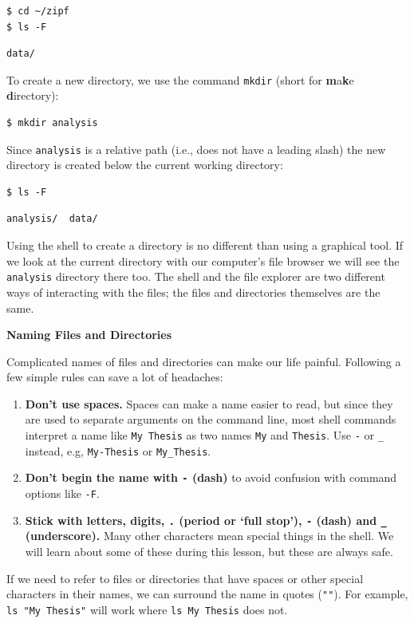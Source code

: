 \documentclass[
]{krantz}
\renewenvironment{quote}{\begin{VF}}{\end{VF}}
\begin{document}
\begin{verbatim}
$ cd ~/zipf
$ ls -F
\end{verbatim}

\begin{verbatim}
data/
\end{verbatim}

To create a new directory,
we use the command \texttt{mkdir} (short for \textbf{m}a\textbf{k}e \textbf{d}irectory):

\begin{verbatim}
$ mkdir analysis
\end{verbatim}

Since \texttt{analysis} is a relative path
(i.e., does not have a leading slash)
the new directory is created below the current working directory:

\begin{verbatim}
$ ls -F
\end{verbatim}

\begin{verbatim}
analysis/  data/
\end{verbatim}

Using the shell to create a directory is no different than using a graphical tool.
If we look at the current directory with our computer's file browser
we will see the \texttt{analysis} directory there too.
The shell and the file explorer are two different ways of interacting with the files;
the files and directories themselves are the same.

\begin{quote}
\textbf{Naming Files and Directories}

Complicated names of files and directories can make our life painful.
Following a few simple rules can save a lot of headaches:

\begin{enumerate}
\def\labelenumi{\arabic{enumi}.}
\item
  \textbf{Don't use spaces.}
  Spaces can make a name easier to read,
  but since they are used to separate arguments on the command line,
  most shell commands interpret a name like \texttt{My\ Thesis} as two names \texttt{My} and \texttt{Thesis}.
  Use \texttt{-} or \texttt{\_} instead,
  e.g, \texttt{My-Thesis} or \texttt{My\_Thesis}.
\item
  \textbf{Don't begin the name with \texttt{-} (dash)}
  to avoid confusion with command options like \texttt{-F}.
\item
  \textbf{Stick with letters, digits, \texttt{.} (period or `full stop'), \texttt{-} (dash) and \texttt{\_} (underscore).}
  Many other characters mean special things in the shell.
  We will learn about some of these during this lesson,
  but these are always safe.
\end{enumerate}

If we need to refer to files or directories that have spaces or other special characters in their names,
we can surround the name in quotes (\texttt{""}).
For example, \texttt{ls\ "My\ Thesis"} will work where \texttt{ls\ My\ Thesis} does not.
\end{quote}
\end{document}

